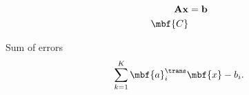 \begin{align}
  \mathbf{A} \mathbf{x} & = \mathbf{b} \\
  \mbf{C}
\end{align}

Sum of errors
\begin{align}
  \sum_{k=1}^{K}\mbf{a}_{i}^{\trans}\mbf{x} - b_{i}.
\end{align}
